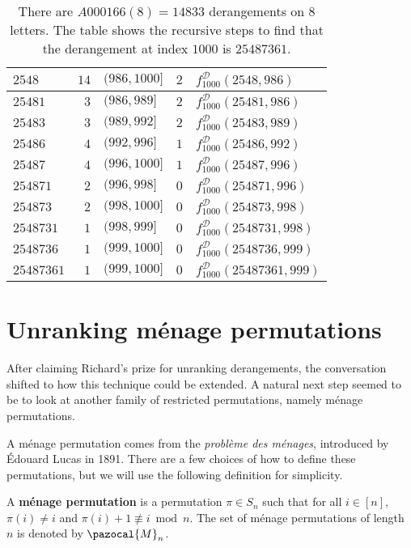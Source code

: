 \begin{table}
\begin{tabular}{|l|r|l|c|l|}
  $2548    $ & $14$   & $(986, 1000]$     & $2$ & $f^{\mathcal{D}}_{1000}(2548, 986)$     \\
  \hline
  $25481   $ & $3$    & $(986, 989]$      & $2$ & $f^{\mathcal{D}}_{1000}(25481, 986)$    \\
  $25483   $ & $3$    & $(989, 992]$      & $2$ & $f^{\mathcal{D}}_{1000}(25483, 989)$    \\
  $25486   $ & $4$    & $(992, 996]$      & $1$ & $f^{\mathcal{D}}_{1000}(25486, 992)$    \\
  $25487   $ & $4$    & $(996, 1000]$     & $1$ & $f^{\mathcal{D}}_{1000}(25487, 996)$    \\
  \hline
  $254871   $ & $2$   & $(996, 998]$      & $0$ & $f^{\mathcal{D}}_{1000}(254871, 996)$   \\
  $254873   $ & $2$   & $(998, 1000]$     & $0$ & $f^{\mathcal{D}}_{1000}(254873, 998)$   \\
  \hline
  $2548731  $ & $1$   & $(998, 999]$      & $0$ & $f^{\mathcal{D}}_{1000}(2548731, 998)$  \\
  $2548736  $ & $1$   & $(999, 1000]$     & $0$ & $f^{\mathcal{D}}_{1000}(2548736, 999)$  \\
  \hline
  $25487361 $ & $1$   & $(999, 1000]$     & $0$ & $f^{\mathcal{D}}_{1000}(25487361, 999)$ \\
  \hline
\end{tabular}
\caption[Steps for computing the $1000$th derangement in $S_8$]{
  There are $A000166(8) = 14833$ derangements on $8$ letters.
  The table shows the recursive steps to find that the derangement at index
  $1000$ is $25487361$.
}
\label{table:unrankDerangement}
\end{table}

\section{Unranking m\'enage permutations}
\label{sec:unrankingMenage}
After claiming Richard's prize for unranking derangements, the conversation shifted to
how this technique could be extended. A natural next step seemed to be to look
at another family of restricted permutations, namely m\'enage permutations.

A m\'enage permutation comes from the \textit{probl\`eme des m\'enages},
introduced by \'Edouard Lucas in 1891.
There are a few choices of how to define these permutations, but we will
use the following definition for simplicity.
\begin{definition}
  A \textbf{m\'enage permutation} is a permutation $\pi \in S_n$ such that for
  all $i \in [n]$,
  $\pi(i) \neq i$ and
  $\pi(i) + 1 \not\equiv i \bmod n$.
  The set of m\'enage permutations of length $n$ is denoted by $\pazocal{M}_n$.
\end{definition}

